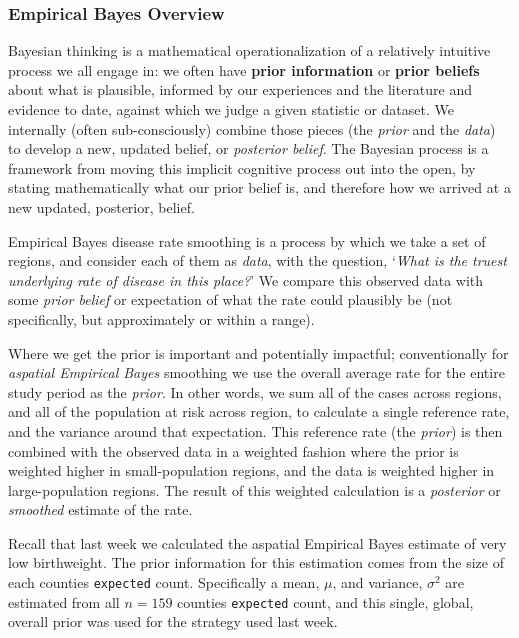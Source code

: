 \documentclass[
]{book}
\newcommand{\passthrough}[1]{#1}
\begin{document}
\hypertarget{empirical-bayes-overview}{%
\subsubsection{Empirical Bayes Overview}\label{empirical-bayes-overview}}

Bayesian thinking is a mathematical operationalization of a relatively intuitive process we all engage in: we often have \textbf{prior information} or \textbf{prior beliefs} about what is plausible, informed by our experiences and the literature and evidence to date, against which we judge a given statistic or dataset. We internally (often sub-consciously) combine those pieces (the \emph{prior} and the \emph{data}) to develop a new, updated belief, or \emph{posterior belief}. The Bayesian process is a framework from moving this implicit cognitive process out into the open, by stating mathematically what our prior belief is, and therefore how we arrived at a new updated, posterior, belief.

Empirical Bayes disease rate smoothing is a process by which we take a set of regions, and consider each of them as \emph{data}, with the question, `\emph{What is the truest underlying rate of disease in this place?}' We compare this observed data with some \emph{prior belief} or expectation of what the rate could plausibly be (not specifically, but approximately or within a range).

Where we get the prior is important and potentially impactful; conventionally for \emph{aspatial Empirical Bayes} smoothing we use the overall average rate for the entire study period as the \emph{prior}. In other words, we sum all of the cases across regions, and all of the population at risk across region, to calculate a single reference rate, and the variance around that expectation. This reference rate (the \emph{prior}) is then combined with the observed data in a weighted fashion where the prior is weighted higher in small-population regions, and the data is weighted higher in large-population regions. The result of this weighted calculation is a \emph{posterior} or \emph{smoothed} estimate of the rate.

Recall that last week we calculated the aspatial Empirical Bayes estimate of very low birthweight. The prior information for this estimation comes from the size of each counties \passthrough{\lstinline!expected!} count. Specifically a mean, \(\mu\), and variance, \(\sigma^2\) are estimated from all \(n=159\) counties \passthrough{\lstinline!expected!} count, and this single, global, overall prior was used for the strategy used last week.
\end{document}
